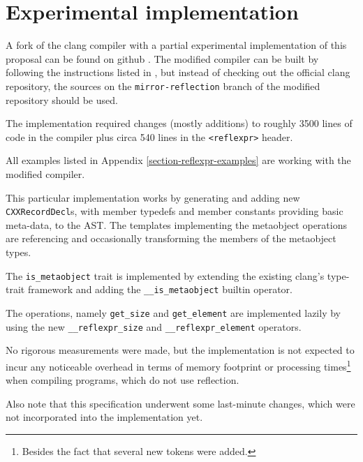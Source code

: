 \section{Experimental implementation}

A fork of the clang compiler with a partial experimental implementation
of this proposal can be found on github \cite{clang-reflexpr-impl}.
The modified compiler can be built by following the instructions listed
in \cite{clang-getting-started}, but instead of checking out the official clang
repository, the sources on the \texttt{mirror-reflection} branch of the modified
repository should be used.

The implementation required changes (mostly additions) to roughly 3500 lines
of code in the compiler plus circa 540 lines in the \texttt{<reflexpr>} header.

All examples listed in Appendix \ref{section-reflexpr-examples} are working with
the modified compiler.

This particular implementation works by generating and adding new \texttt{CXXRecordDecl}s,
with member typedefs and member constants providing basic meta-data, to the AST.
The templates implementing the metaobject operations are referencing and
occasionally transforming the members of the metaobject types.

The \texttt{is\_metaobject} trait is implemented by extending the existing
clang's type-trait framework and adding the \texttt{\_\_is\_metaobject} builtin
operator.

The  operations, namely \texttt{get\_size} and
\texttt{get\_element} are implemented lazily by using the new
\texttt{\_\_reflexpr\_size} and \texttt{\_\_reflexpr\_element} operators.

No rigorous measurements were made, but the implementation is not expected to
incur any noticeable overhead in terms of memory footprint or processing
times\footnote{Besides the fact that several new tokens were added.} when
compiling programs, which do not use reflection.

Also note that this specification underwent some last-minute changes,
which were not incorporated into the implementation yet.
